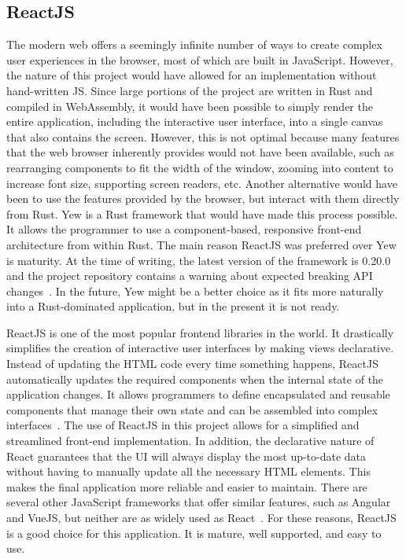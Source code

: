 \subsection{ReactJS} \label{react-js}
The modern web offers a seemingly infinite number of ways to create complex user experiences in the browser, most of which are built in JavaScript.
However, the nature of this project would have allowed for an implementation without hand-written JS. Since large portions of the project are written in Rust and compiled in WebAssembly, it would have been possible to simply render the entire application, including the interactive user interface, into a single canvas that also contains the screen.
However, this is not optimal because many features that the web browser inherently provides would not have been available, such as rearranging components to fit the width of the window, zooming into content to increase font size, supporting screen readers, etc.
Another alternative would have been to use the features provided by the browser, but interact with them directly from Rust.
Yew is a Rust framework that would have made this process possible. It allows the programmer to use a component-based, responsive front-end architecture from within Rust.
The main reason ReactJS was preferred over Yew is maturity. At the time of writing, the latest version of the framework is 0.20.0 and the project repository contains a warning about expected breaking API changes~\cite{yewweb}.
In the future, Yew might be a better choice as it fits more naturally into a Rust-dominated application, but in the present it is not ready.

ReactJS is one of the most popular frontend libraries in the world. It drastically simplifies the creation of interactive user interfaces by making views declarative.
Instead of updating the HTML code every time something happens, ReactJS automatically updates the required components when the internal state of the application changes.
It allows programmers to define encapsulated and reusable components that manage their own state and can be assembled into complex interfaces~\cite{reactweb}.
The use of ReactJS in this project allows for a simplified and streamlined front-end implementation.
In addition, the declarative nature of React guarantees that the UI will always display the most up-to-date data without having to manually update all the necessary HTML elements. This makes the final application more reliable and easier to maintain.
There are several other JavaScript frameworks that offer similar features, such as Angular and VueJS, but neither are as widely used as React~\cite{webframework}.
For these reasons, ReactJS is a good choice for this application. It is mature, well supported, and easy to use.

